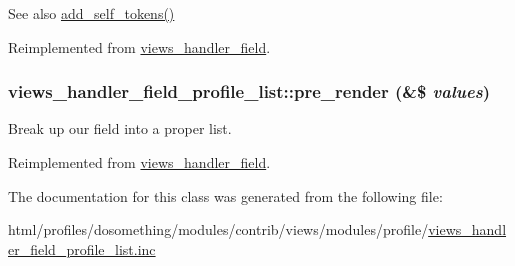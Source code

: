 \begin{DoxySeeAlso}{See also}
\hyperlink{classviews__handler__field__profile__list_a411c5238debac02e7cb3f582f7cd8e9f}{add\_\-self\_\-tokens()} 
\end{DoxySeeAlso}


Reimplemented from \hyperlink{classviews__handler__field_ae33446d1059f13fbfb06a37da04d320e}{views\_\-handler\_\-field}.\hypertarget{classviews__handler__field__profile__list_a18beb938eb1e7839c96ed6d6e6600418}{
\subsubsection[{pre\_\-render}]{\setlength{\rightskip}{0pt plus 5cm}views\_\-handler\_\-field\_\-profile\_\-list::pre\_\-render (\&\$ {\em values})}}
\label{classviews__handler__field__profile__list_a18beb938eb1e7839c96ed6d6e6600418}
Break up our field into a proper list. 

Reimplemented from \hyperlink{classviews__handler__field_aff134f525e1f83271183939fda4cd0e8}{views\_\-handler\_\-field}.

The documentation for this class was generated from the following file:\begin{DoxyCompactItemize}
\item 
html/profiles/dosomething/modules/contrib/views/modules/profile/\hyperlink{views__handler__field__profile__list_8inc}{views\_\-handler\_\-field\_\-profile\_\-list.inc}\end{DoxyCompactItemize}
